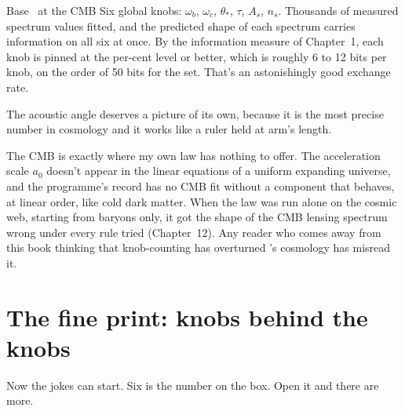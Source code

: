 

\begin{knobbox}{Base \LCDM\ at the CMB}
Six global knobs: $\omega_b$, $\omega_c$, $\theta_*$, $\tau$, $A_s$, $n_s$. Thousands of measured spectrum values fitted, and the predicted shape of each spectrum carries information on all six at once. By the information measure of Chapter~1, each knob is pinned at the per-cent level or better, which is roughly 6 to 12 bits per knob, on the order of 50 bits for the set. That's an astonishingly good exchange rate.
\end{knobbox}

The acoustic angle deserves a picture of its own, because it is the most precise number in cosmology and it works like a ruler held at arm's length.





\begin{honestbox}
The CMB is exactly where my own law has nothing to offer. The acceleration scale $a_0$ doesn't appear in the linear equations of a uniform expanding universe, and the programme's record has no CMB fit without a component that behaves, at linear order, like cold dark matter. When the law was run alone on the cosmic web, starting from baryons only, it got the shape of the CMB lensing spectrum wrong under every rule tried (Chapter~12). Any reader who comes away from this book thinking that knob-counting has overturned \LCDM's cosmology has misread it.
\end{honestbox}

\section{The fine print: knobs behind the knobs}

Now the jokes can start. Six is the number on the box. Open it and there are more.

